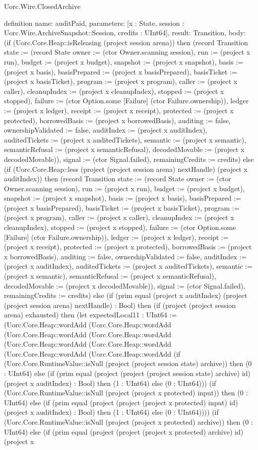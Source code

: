 \begin{lexlean}{Uorc.Wire.ClosedArchive}
\begin{semanticmodule}
definition{
  name: auditPaid,
  parameters: [x : State, session : Uorc.Wire.ArchiveSnapshot::Session, credits : UInt64],
  result: Transition,
  body: (if (Uorc.Core.Heap::isReleasing (project session arena)) then (record Transition {state := (record State {owner := (ctor Owner.scanning session), run := (project x run), budget := (project x budget), snapshot := (project x snapshot), basis := (project x basis), basisPrepared := (project x basisPrepared), basisTicket := (project x basisTicket), program := (project x program), caller := (project x caller), cleanupIndex := (project x cleanupIndex), stopped := (project x stopped), failure := (ctor Option.some [Failure] (ctor Failure.ownership)), ledger := (project x ledger), receipt := (project x receipt), protected := (project x protected), borrowedBasis := (project x borrowedBasis), auditing := false, ownershipValidated := false, auditIndex := (project x auditIndex), auditedTickets := (project x auditedTickets), semantic := (project x semantic), semanticRefusal := (project x semanticRefusal), decodedMovable := (project x decodedMovable)}), signal := (ctor Signal.failed), remainingCredits := credits}) else (if (Uorc.Core.Heap::less (project (project session arena) nextHandle) (project x auditIndex)) then (record Transition {state := (record State {owner := (ctor Owner.scanning session), run := (project x run), budget := (project x budget), snapshot := (project x snapshot), basis := (project x basis), basisPrepared := (project x basisPrepared), basisTicket := (project x basisTicket), program := (project x program), caller := (project x caller), cleanupIndex := (project x cleanupIndex), stopped := (project x stopped), failure := (ctor Option.some [Failure] (ctor Failure.ownership)), ledger := (project x ledger), receipt := (project x receipt), protected := (project x protected), borrowedBasis := (project x borrowedBasis), auditing := false, ownershipValidated := false, auditIndex := (project x auditIndex), auditedTickets := (project x auditedTickets), semantic := (project x semantic), semanticRefusal := (project x semanticRefusal), decodedMovable := (project x decodedMovable)}), signal := (ctor Signal.failed), remainingCredits := credits}) else (if (prim equal (project x auditIndex) (project (project session arena) nextHandle) : Bool) then (if (project (project session arena) exhausted) then (let expectedLocal11 : UInt64 := (Uorc.Core.Heap::wordAdd (Uorc.Core.Heap::wordAdd (Uorc.Core.Heap::wordAdd (Uorc.Core.Heap::wordAdd (Uorc.Core.Heap::wordAdd (Uorc.Core.Heap::wordAdd (Uorc.Core.Heap::wordAdd (Uorc.Core.Heap::wordAdd (if (Uorc.Core.RuntimeValue::isNull (project (project session state) archive)) then (0 : UInt64) else (if (prim equal (project (project (project session state) archive) id) (project x auditIndex) : Bool) then (1 : UInt64) else (0 : UInt64))) (if (Uorc.Core.RuntimeValue::isNull (project (project x protected) input)) then (0 : UInt64) else (if (prim equal (project (project (project x protected) input) id) (project x auditIndex) : Bool) then (1 : UInt64) else (0 : UInt64)))) (if (Uorc.Core.RuntimeValue::isNull (project (project x protected) archive)) then (0 : UInt64) else (if (prim equal (project (project (project x protected) archive) id) (project x }
\end{semanticmodule}
\end{lexlean}
